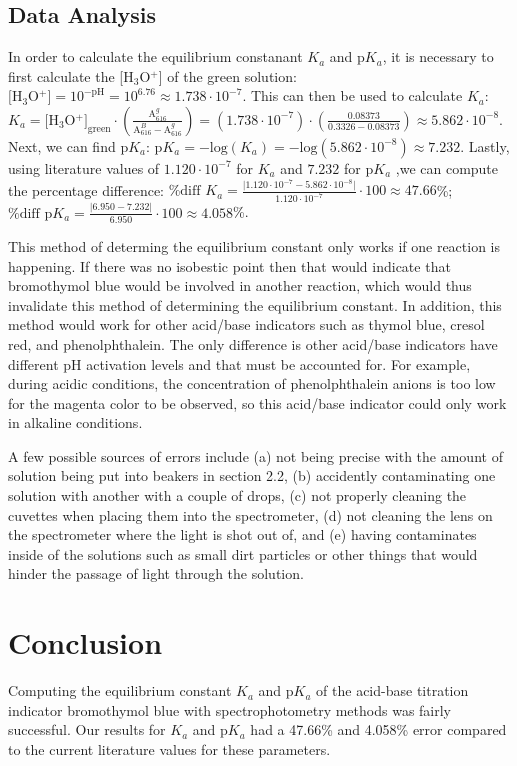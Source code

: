 \documentclass[10pt]{article} %
\begin{document}
\subsection{Data Analysis}
In order to calculate the equilibrium constanant $K_a$ and p$K_a$, it is necessary to first calculate the [H$_3$O$^+$] of the green solution: $\text{[H$_3$O$^+$]} = 10^{-\text{pH}} = 10^{6.76} \approx 1.738 \cdot 10^{-7}$. This can then be used to calculate $K_a$: $K_a = \text{[H$_3$O$^+$]}_{\text{green}} \cdot \left(\frac{\text{A}^{g}_{616}}{\text{A}^{B}_{616} - \text{A}^{g}_{616}} \right) = \left(1.738 \cdot 10^{-7} \right) \cdot \left( \frac{0.08373}{0.3326 - 0.08373} \right) \approx 5.862 \cdot 10^{-8}$. Next, we can find p$K_a$: $\text{p}K_a = -\text{log}(K_a) = -\text{log}(5.862 \cdot 10^{-8}) \approx 7.232$. Lastly, using literature values of $1.120\cdot10^{-7}$ for $K_a$ and $7.232$ for p$K_a$ \cite{Klotz},we can compute the percentage difference: $\text{\% diff } K_a = \frac{\lvert1.120\cdot10^{-7} - 5.862\cdot10^{-8}\lvert}{1.120\cdot10^{-7}}\cdot 100 \approx 47.66$\%; $\text{\% diff p}K_a = \frac{\lvert 6.950 - 7.232\lvert}{6.950}\cdot 100 \approx 4.058$\%.

This method of determing the equilibrium constant only works if one reaction is happening. If there was no isobestic point then that would indicate that bromothymol blue would be involved in another reaction, which would thus invalidate this method of determining the equilibrium constant. In addition, this method would work for other acid/base indicators such as thymol blue, cresol red, and phenolphthalein. The only difference is other acid/base indicators have different pH activation levels and that must be accounted for. For example, during acidic conditions, the concentration of phenolphthalein anions is too low for the magenta color to be observed, so this acid/base indicator could only work in alkaline conditions.  

A few possible sources of errors include (a) not being precise with the amount of solution being put into beakers in section 2.2, (b) accidently contaminating one solution with another with a couple of drops, (c) not properly cleaning the cuvettes when placing them into the spectrometer, (d) not cleaning the lens on the spectrometer where the light is shot out of, and (e) having contaminates inside of the solutions such as small dirt particles or other things that would hinder the passage of light through the solution.

\section{Conclusion}
Computing the equilibrium constant $K_a$ and p$K_a$ of the acid-base titration indicator bromothymol blue with spectrophotometry methods was fairly successful. Our results for $K_a$ and p$K_a$ had a 47.66\% and 4.058\% error compared to the current literature values for these parameters.


\newpage 
 

\end{document}
